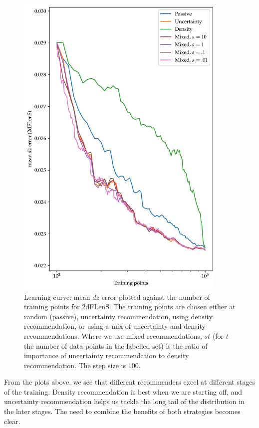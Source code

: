 \documentclass[11pt,twoside,openright]{report}
\begin{document}
  \begin{figure}
    \centering
    \includegraphics[width=0.9\textwidth]{mixed.pdf}
    \caption{Learning curve: mean $dz$ error plotted against the number of training points for 2dFLenS. The training points are chosen either at random (passive), uncertainty recommendation, using density recommendation, or using a mix of uncertainty and density recommendations. Where we use mixed recommendations, $st$ (for $t$ the number of data points in the labelled set) is the ratio of importance of uncertainty recommendation to density recommendation. The step size is $100$.}
    \label{fig:mixed}
  \end{figure}

From the plots above, we see that different recommenders excel at different stages of the training. Density recommendation is best when we are starting off, and uncertainty recommendation helps us tackle the long tail of the distribution in the later stages. The need to combine the benefits of both strategies becomes clear.
\end{document}
